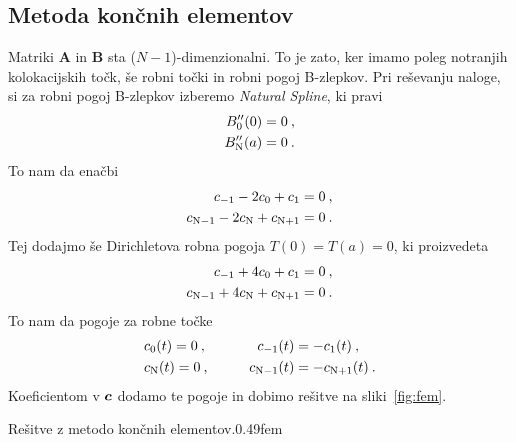 \documentclass{porocilo}
\newcommand{\bi}[1]{\hbox{\boldmath{$#1$}}}
\begin{document}
\subsection{Metoda končnih elementov}
Matriki $\mathbf{A}$ in $\mathbf{B}$ sta ($N-1$)-dimenzionalni. To je zato, ker imamo poleg notranjih kolokacijskih točk, še robni točki in robni pogoj B-zlepkov. Pri reševanju naloge, si za robni pogoj B-zlepkov izberemo \textit{Natural Spline}, ki pravi
\begin{align*}
    B_0''(0) = 0 \>, \\
    B_{\rm N}''(a) = 0 \>.
\end{align*}
To nam da enačbi
\begin{align*}
    c_{\rm -1} - 2 c_0 + c_{\rm 1} = 0 \>, \\
    c_{\rm N-1} - 2 c_{\rm N} + c_{\rm N+1} = 0 \>.
\end{align*}
Tej dodajmo še Dirichletova robna pogoja $T(0) = T(a) = 0$, ki proizvedeta
\begin{align*}
    c_{\rm -1} + 4 c_0 + c_{\rm 1} = 0 \>, \\
    c_{\rm N-1} + 4 c_{\rm N} + c_{\rm N+1} = 0 \>.
\end{align*}
To nam da pogoje za robne točke
\begin{align*}
     & c_0(t)        = 0 \>, \qquad & c_{\rm -1}(t)   &= - c_{\rm 1}(t)  \>, \\
     & c_{\rm N}(t)  = 0 \>, \qquad & c_{\rm N-1}(t)  &= - c_{\rm N+1}(t) \>.
\end{align*}
Koeficientom v $\bi{c}$ dodamo te pogoje in dobimo rešitve na sliki~\ref{fig:fem}.

\begin{multifig}{2}{Rešitve z metodo končnih elementov.}{0.49}{fem}
\end{multifig}
\end{document}
